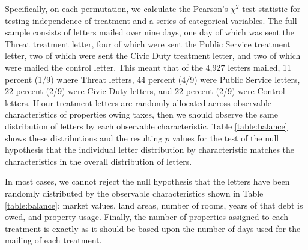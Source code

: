 \documentclass[12pt,titlepage]{article}
\begin{document}
Specifically, on each permutation, we calculate the Pearson's $\chi^2$ test 
statistic for testing independence of treatment and a series of categorical variables.
The full sample
consists of letters mailed over nine days, one day of which was sent the
Threat treatment letter, four of which were sent the Public Service
treatment letter, two of which were sent the Civic Duty treatment letter,
and two of which were mailed the control letter.  This meant that of
the 4,927 letters mailed, 11 percent (1/9) where Threat letters, 44
percent (4/9) were Public Service letters, 22 percent (2/9) were
Civic Duty letters, and 22 percent (2/9) were Control letters.  If our
treatment letters are randomly allocated across observable
characteristics of properties owing taxes, then we should observe the
same distribution of letters by each observable characteristic.  Table
\ref{table:balance} shows these distributions and the resulting $p$
values for the test of the null hypothesis that the individual letter
distribution by characteristic matches the characteristics in the
overall distribution of letters.

In most cases, we cannot reject the null hypothesis that the letters
have been randomly distributed by the observable characteristics shown
in Table \ref{table:balance}: market values, land areas, number
of rooms, years of that debt is owed, and property usage. Finally, the number of properties
assigned to each treatment is exactly as it should be based upon the
number of days used for the mailing of each treatment.
\end{document}

